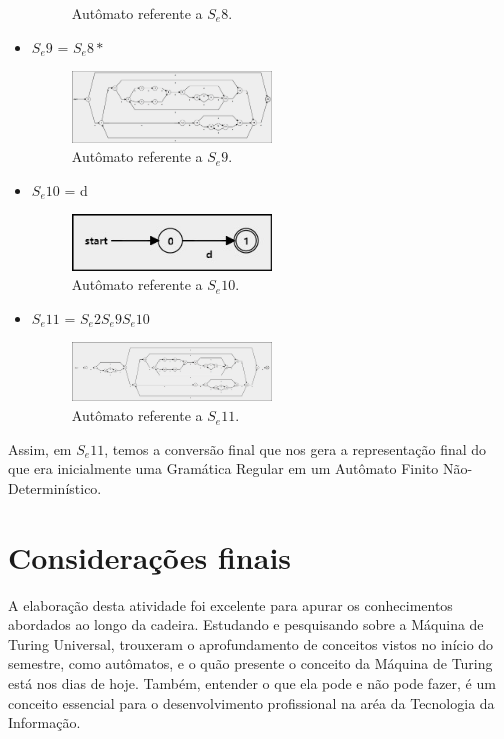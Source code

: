 \documentclass[
	article,			%
	11pt,				%
	oneside,			%
	a4paper,			%
	english,			%
	brazil,				%
	sumario=tradicional
	]{abntex2}
\begin{document}
\begin{itemize}
\begin{figure}[H]
\caption{\label{fig:r8}Autômato referente a $S_e8$.}
\end{figure}
        \item $S_e9$ = $S_e8*$ 
            \begin{figure}[H]
\centering
\includegraphics[width=0.5\textwidth]{r9.jpg}
\caption{\label{fig:r9}Autômato referente a $S_e9$.}
\end{figure}
        \item $S_e10$ = d 
            \begin{figure}[H]
\centering
\includegraphics[width=0.5\textwidth]{r10.jpg}
\caption{\label{fig:r10}Autômato referente a $S_e10$.}
\end{figure}
        \item $S_e11$ = $S_e2S_e9S_e10$ 
            \begin{figure}[H]
\centering
\includegraphics[width=0.5\textwidth]{r11.jpg}
\caption{\label{fig:r11}Autômato referente a $S_e11$.}
\end{figure}
    \end{itemize}
    
    Assim, em $S_e11$, temos a conversão final que nos gera a representação final do que era inicialmente uma Gramática Regular em um Autômato Finito Não-Determinístico. 
    

\section*{Considerações finais}
    A elaboração desta atividade foi excelente para apurar os conhecimentos abordados ao longo da cadeira. Estudando e pesquisando sobre a Máquina de Turing Universal, trouxeram o aprofundamento de conceitos vistos no início do semestre, como autômatos, e o quão presente o conceito da Máquina de Turing está nos dias de hoje. Também, entender o que ela pode e não pode fazer, é um conceito essencial para o desenvolvimento profissional na aréa da Tecnologia da Informação.
    
\end{document}
